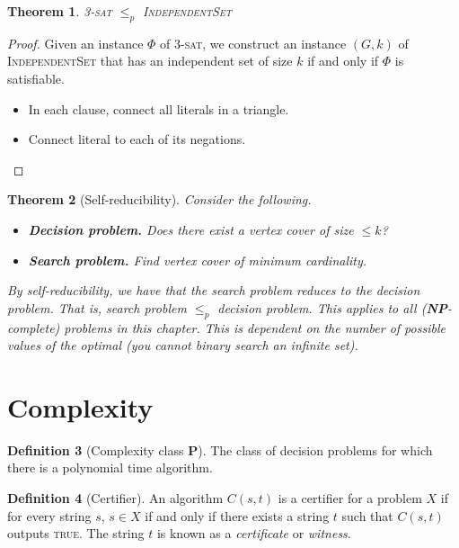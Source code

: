 \documentclass[10pt, oneside, reqno]{amsart}
\theoremstyle{plain}%
\newtheorem{thm}{Theorem}[section]
\theoremstyle{definition}
\newtheorem{defn}[thm]{Definition}
\theoremstyle{remark}
\begin{document}
\begin{thm}
	\textsc{3-sat} $\leq_p$ \textsc{IndependentSet}
\end{thm}
\begin{proof}
	Given an instance $\Phi$ of \textsc{3-sat}, we construct an instance $(G,k)$ of \textsc{IndependentSet} that has an independent set of size $k$ if and only if $\Phi$ is satisfiable.  
	\begin{itemize}
		\item In each clause, connect all literals in a triangle.  
		\item Connect literal to each of its negations.
	\end{itemize}
\end{proof}



\begin{thm}[Self-reducibility]Consider the following.
	\begin{itemize}
		\item \textbf{Decision problem.}  Does there exist a vertex cover of size $\leq k$?
		
		\item \textbf{Search problem.}  Find vertex cover of minimum cardinality.
		
	\end{itemize}
		
		
		By self-reducibility, we have that the search problem reduces to the decision problem. That is, search problem $\leq_p$ decision problem.  This applies to all (\textbf{NP}-complete) problems in this chapter. This is dependent on the number of possible values of the optimal (you cannot binary search an infinite set).
\end{thm}





\section{Complexity} %
\label{sec:complexity}

\begin{defn}[Complexity class \textbf{P}]
	The class of decision problems for which there is a polynomial time algorithm.
\end{defn}

\begin{defn}[Certifier]
	An algorithm $C(s,t)$ is a certifier for a problem $X$ if for every string $s$, $s \in X$ if and only if there exists a string $t$ such that $C(s,t)$ outputs \textsc{true}.  The string $t$ is known as a \emph{certificate} or \emph{witness}.  
\end{defn}
\end{document}
